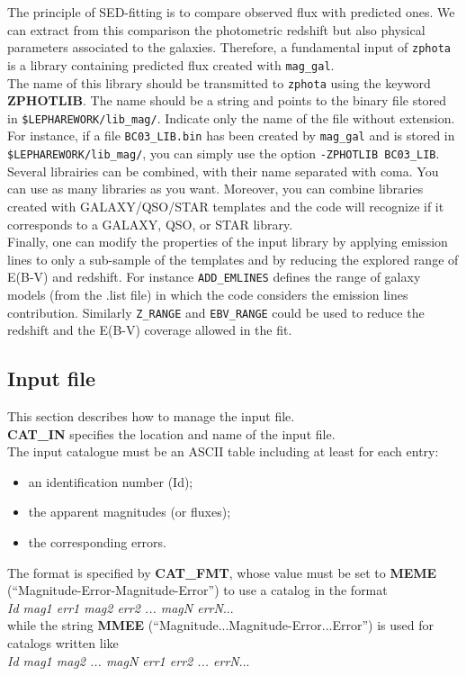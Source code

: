 \documentclass[12pt]{article}
\begin{document}
The principle of SED-fitting is to compare observed flux with predicted ones. We can extract from this comparison the photometric redshift but also physical parameters associated to the galaxies. Therefore, a fundamental input of \texttt{zphota} is a library containing predicted flux created with \texttt{mag\_gal}.\\

The name of this library should be transmitted to \texttt{zphota} using the keyword {\bf ZPHOTLIB}. The name should be a string and points to the binary file stored in \texttt{\$LEPHAREWORK/lib\_mag/}. Indicate only the name of the file without extension. For instance, if a file \texttt{BC03\_LIB.bin} has been created by \texttt{mag\_gal} and is stored in \texttt{\$LEPHAREWORK/lib\_mag/}, you can simply use the option \texttt{-ZPHOTLIB BC03\_LIB}.\\ 

Several librairies can be combined, with their name separated with coma. You can use as many libraries as you want. Moreover, you can combine libraries created with GALAXY/QSO/STAR templates and the code will recognize if it corresponds to a GALAXY, QSO, or STAR library. \\ 

Finally, one can modify the properties of the input library by applying emission lines to only a sub-sample of the templates and by reducing the explored range of E(B-V) and redshift. For instance \texttt{ADD\_EMLINES} defines the range of galaxy models (from the .list file) in which the code considers the emission lines contribution. Similarly \texttt{Z\_RANGE} and \texttt{EBV\_RANGE} could be used to reduce the redshift and the E(B-V) coverage allowed in the fit.

\subsection{Input file}\label{input}

This section describes how to manage the input file. \\
 
\noindent \textbf{CAT\_IN} specifies the location and  name of the input file. \\
\noindent The input catalogue must be an ASCII table including at least for each entry:
\begin{itemize}
    \item an identification number (Id);
    \item the apparent magnitudes (or fluxes);
    \item the corresponding errors.
\end{itemize}
The format is specified by \textbf{CAT\_FMT}, whose value must be set to \textbf{MEME} (``Magnitude-Error-Magnitude-Error'') to use a catalog in the format \\
\textit{Id  mag1 err1  mag2 err2  ...  magN errN}...\\
while the string \textbf{MMEE} (``Magnitude...Magnitude-Error...Error'') is used for catalogs written like\\
\textit{Id  mag1 mag2 ... magN  err1 err2 ... errN}... \\
\end{document}
